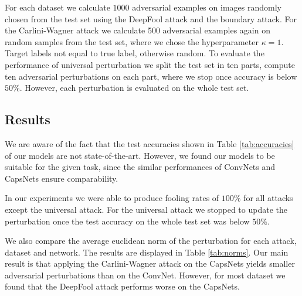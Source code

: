 \documentclass{article}
\begin{document}
For each dataset we calculate $1000$ adversarial examples on images randomly chosen from the test set using the DeepFool attack and the boundary attack.
For the Carlini-Wagner attack we calculate 500 adversarial examples again on random samples from the test set, where we chose the hyperparameter $\kappa = 1$. Target labels not equal to true label, otherwise random. To evaluate the performance of universal perturbation we split the test set in ten parts, compute ten adversarial perturbations on each part, where we stop once accuracy is below $50\%$. However, each perturbation is evaluated on the whole test set.


\subsection{Results}

We are aware of the fact that the test accuracies shown in Table \ref{tab:accuracies} of our models are not state-of-the-art. However, we found our models to be suitable for the given task, since the similar performances of ConvNets and CapsNets ensure comparability. 

In our experiments we were able to produce fooling rates of $100\%$ for all attacks except the universal attack. For the universal attack we stopped to update the perturbation once the test accuracy on the whole test set was below $50\%$.

We also compare the average euclidean norm of the perturbation for each attack, dataset and network. The results are displayed in Table \ref{tab:norms}. Our main result is that applying the Carlini-Wagner attack on the CapsNets yields smaller adversarial perturbations than on the ConvNet. However, for most dataset we found that the DeepFool attack performs worse on the CapsNets.
\end{document}
